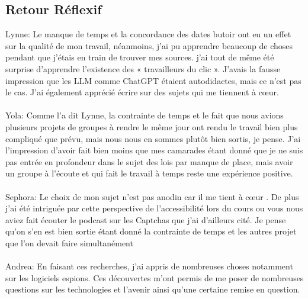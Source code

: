 \documentclass{article}
\begin{document}
\subsection{Retour Réflexif}
Lynne:  Le manque de temps et la concordance des dates butoir ont eu un effet sur la qualité de mon travail, néanmoins, j'ai pu apprendre beaucoup de choses pendant que j’étais en train de trouver mes sources. j’ai tout de même été surprise d'apprendre l'existence des « travailleurs du clic ». J'avais la fausse impression que les LLM comme ChatGPT étaient autodidactes, mais ce n'est pas le cas. J’ai également apprécié écrire sur des sujets qui me tiennent à cœur. \\\\
Yola: Comme l'a dit Lynne, la contrainte de temps et le fait que nous avions plusieurs projets de groupes à rendre le même jour ont rendu le travail bien plus compliqué que prévu, mais nous nous en sommes plutôt bien sortis, je pense. J'ai l'impression d'avoir fait bien moins que mes camarades étant donné que je ne suis pas entrée en profondeur dans le sujet des lois par manque de place, mais avoir un groupe à l'écoute et qui fait le travail à temps reste une expérience positive.\\\\
Sephora: Le choix de mon sujet n'est pas anodin car il me tient à cœur . De plus j'ai été intriguée par cette perspective de l'accessibilité lors du cours ou vous nous aviez fait écouter le podcast sur les Captchas que j'ai d'ailleurs cité. Je pense qu'on s'en est bien sortie étant donné la contrainte de temps et les autres projet que l'on devait faire simultanément \\\\
Andrea:  En faisant ces recherches, j’ai appris de nombreuses choses notamment sur les logiciels espions. Ces découvertes m’ont permis de me poser de nombreuses questions sur les technologies et l’avenir ainsi qu’une certaine remise en question.  \\\\




\end{document}
